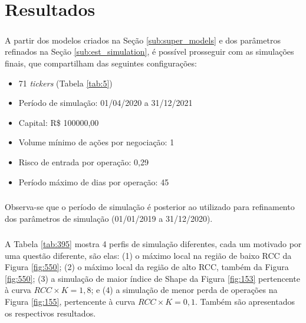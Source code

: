 \chapter{Resultados}
\label{cap4}



\paragraph{} A partir dos modelos criados na Seção \ref{sub:super_models} e dos parâmetros refinados na Seção \ref{sub:est_simulation}, é possível prosseguir com as simulações finais, que compartilham das seguintes configurações:

\begin{itemize}
    \item 71 \textit{tickers} (Tabela \ref{tab:5})
    \item Período de simulação: 01/04/2020 a 31/12/2021
    \item Capital: R\$ 100000,00
    \item Volume mínimo de ações por negociação: 1
    \item Risco de entrada por operação: 0,29
    \item Período máximo de dias por operação: 45
\end{itemize}

\paragraph{} Observa-se que o período de simulação é posterior ao utilizado para refinamento dos parâmetros de simulação (01/01/2019 a 31/12/2020).

\paragraph{} A Tabela \ref{tab:395} mostra 4 perfis de simulação diferentes, cada um motivado por uma questão diferente, são elas: (1) o máximo local na região de baixo RCC da Figura \ref{fig:550}; (2) o máximo local da região de alto RCC, também da Figura \ref{fig:550}; (3) a simulação de maior índice de Shape da Figura \ref{fig:153} pertencente à curva \begin{math} RCC \times K = 1,8 \end{math}; e (4) a simulação de menor perda de operações na Figura \ref{fig:155}, pertencente à curva \begin{math} RCC \times K = 0,1 \end{math}. Também são apresentados os respectivos resultados.

